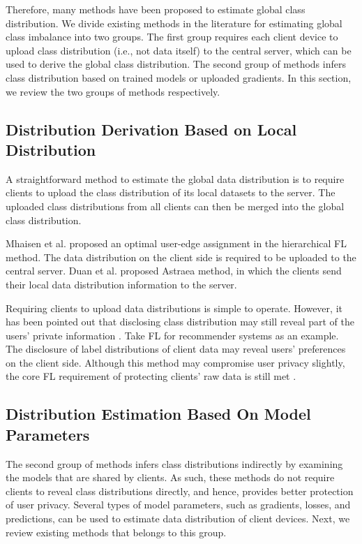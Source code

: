 \documentclass[10pt,journal,compsoc]{IEEEtran}
\begin{document}
Therefore, many methods have been proposed to estimate global class distribution. We divide existing methods in the literature for estimating global class imbalance into two groups. The first group requires each client device to upload class distribution (i.e., not data itself) to the central server, which can be used to derive the global class distribution. The second group of methods infers class distribution based on trained models or uploaded gradients. In this section, we review the two groups of methods respectively.
\vspace{-0.2cm}

\subsection{Distribution Derivation Based on Local Distribution}
A straightforward method to estimate the global data distribution is to require clients to upload the class distribution of its local datasets to the server. The uploaded class distributions from all clients can then be merged into the global class distribution. 


Mhaisen et al. \cite{mhaisen2021optimal} proposed an optimal user-edge assignment in the hierarchical FL method. The data distribution on the client side is required to be uploaded to the central server. 
Duan et al. \cite{duan2019astraea} \cite{duan2020self} proposed Astraea method, in which the clients send their local data distribution information to the server.

Requiring clients to upload data distributions is simple to operate. However, it has been pointed out that disclosing class distribution may still reveal part of the users' private information \cite{wang2019eavesdrop} \cite{fu2021cic}. Take FL for recommender systems as an example. The disclosure of label distributions of client data may reveal users' preferences on the client side. Although this method may compromise user privacy slightly, the core FL requirement of protecting clients’ raw data is still met \cite{mhaisen2021optimal}.
\vspace{-0.2cm} 

\subsection{Distribution Estimation Based On Model Parameters}
The second group of methods infers class distributions indirectly by examining the  models that are shared by clients. As such, these methods do not require clients to reveal class distributions directly, and hence, provides better protection of user privacy. Several types of model parameters, such as gradients, losses, and predictions, can be used to estimate data distribution of client devices. Next, we review existing methods that belongs to this group.
\end{document}
